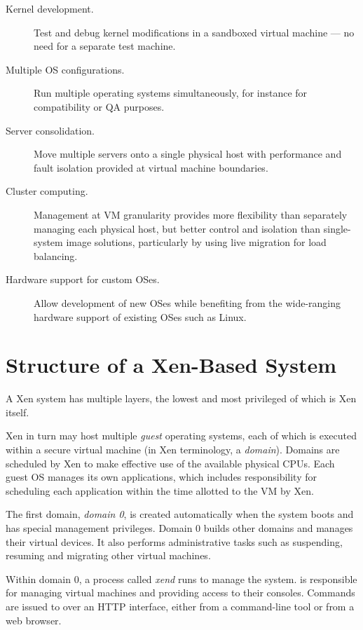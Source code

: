 \begin{description}
\item [Kernel development.] Test and debug kernel modifications in a
  sandboxed virtual machine --- no need for a separate test machine.
\item [Multiple OS configurations.] Run multiple operating systems
  simultaneously, for instance for compatibility or QA purposes.
\item [Server consolidation.] Move multiple servers onto a single
  physical host with performance and fault isolation provided at
  virtual machine boundaries.
\item [Cluster computing.] Management at VM granularity provides more
  flexibility than separately managing each physical host, but better
  control and isolation than single-system image solutions,
  particularly by using live migration for load balancing.
\item [Hardware support for custom OSes.] Allow development of new
  OSes while benefiting from the wide-ranging hardware support of
  existing OSes such as Linux.
\end{description}


\section{Structure of a Xen-Based System}

A Xen system has multiple layers, the lowest and most privileged of
which is Xen itself. 

Xen in turn may host multiple \emph{guest} operating systems, each of
which is executed within a secure virtual machine (in Xen terminology,
a \emph{domain}). Domains are scheduled by Xen to make effective use
of the available physical CPUs.  Each guest OS manages its own
applications, which includes responsibility for scheduling each
application within the time allotted to the VM by Xen.

The first domain, \emph{domain 0}, is created automatically when the
system boots and has special management privileges. Domain 0 builds
other domains and manages their virtual devices. It also performs
administrative tasks such as suspending, resuming and migrating other
virtual machines.

Within domain 0, a process called \emph{xend} runs to manage the
system.  \Xend is responsible for managing virtual machines and
providing access to their consoles.  Commands are issued to \xend over
an HTTP interface, either from a command-line tool or from a web
browser.


